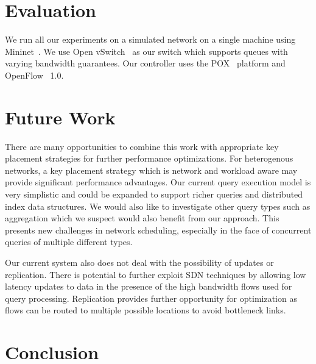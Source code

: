 \documentclass{sig-alternate-2013}
\begin{document}
\section{Evaluation}

We run all our experiments on a simulated network on a single machine using Mininet~\cite{Lantz2010}.
We use Open vSwitch~\cite{Pfaff2009} as our switch which supports queues with varying bandwidth guarantees.
Our controller uses the POX~\cite{Gude2008} platform and OpenFlow~\cite{McKeown2008} 1.0.

\section{Future Work}

There are many opportunities to combine this work with appropriate key placement strategies for further performance optimizations.
For heterogenous networks, a key placement strategy which is network and workload aware may provide significant performance advantages.
Our current query execution model is very simplistic and could be expanded to support richer queries and distributed index data structures.
We would also like to investigate other query types such as aggregation which we suspect would also benefit from our approach.
This presents new challenges in network scheduling, especially in the face of concurrent queries of multiple different types.

Our current system also does not deal with the possibility of updates or replication.
There is potential to further exploit SDN techniques by allowing low latency updates to data in the presence of the high bandwidth flows used for query processing.
Replication provides further opportunity for optimization as flows can be routed to multiple possible locations to avoid bottleneck links.

\section{Conclusion}

\let\theOLDbibliography\thebibliography\renewcommand{\thebibliography}[1]{\theOLDbibliography{#1}%
\item[]\vspace*{0.5mm}}


{\scriptsize

}
\end{document}
